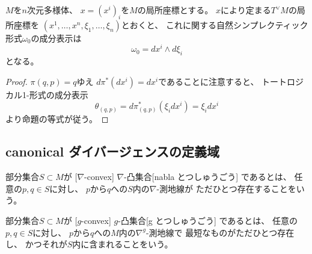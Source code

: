 \documentclass[report]{jlreq}
\begin{document}
\begin{proposition}[自然シンプレクティック形式の成分表示]
    $M$を$n$次元多様体、
    $x = (x^i)_i$を$M$の局所座標とする。
    $x$により定まる$T^\vee M$の局所座標を
    $(x^1, \dots, x^n, \xi_1, \dots, \xi_n)$とおくと、
    これに関する自然シンプレクティック形式$\omega_0$の成分表示は
    \begin{equation}
        \omega_0
            =
                dx^i \wedge d\xi_i
    \end{equation}
    となる。
\end{proposition}

\begin{proof}
    $\pi(q, p) = q$ゆえ
    $d\pi^* (dx^i) = dx^i$であることに注意すると、
    トートロジカル1-形式の成分表示
    \begin{equation}
        \theta_{(q, p)}
            =
                d\pi_{(q, p)}^* (\xi_i dx^i)
            =
                \xi_i dx^i
    \end{equation}
    より命題の等式が従う。
\end{proof}

\begin{definition}[概複素構造]
    \TODO{}
\end{definition}

\begin{definition}[概K\"ahler構造]
    \TODO{}
\end{definition}

\subsection{canonical ダイバージェンスの定義域}

\begin{definition}
    部分集合$S \subset M$が
    [$\nabla$-convex]
        {$\nabla$-凸集合}[nabla とつしゅうごう]
    であるとは、
    任意の$p, q \in S$に対し、
    $p$から$q$への$S$内の$\nabla$-測地線が
    ただひとつ存在することをいう。
\end{definition}

\begin{definition}[$g$-凸集合]
    部分集合$S \subset M$が
    [$g$-convex]
        {$g$-凸集合}[g とつしゅうごう]
    であるとは、
    任意の$p, q \in S$に対し、
    $p$から$q$への$M$内の$\nabla^g$-測地線で
    最短なものがただひとつ存在し、
    かつそれが$S$内に含まれることをいう。
\end{definition}
\end{document}
